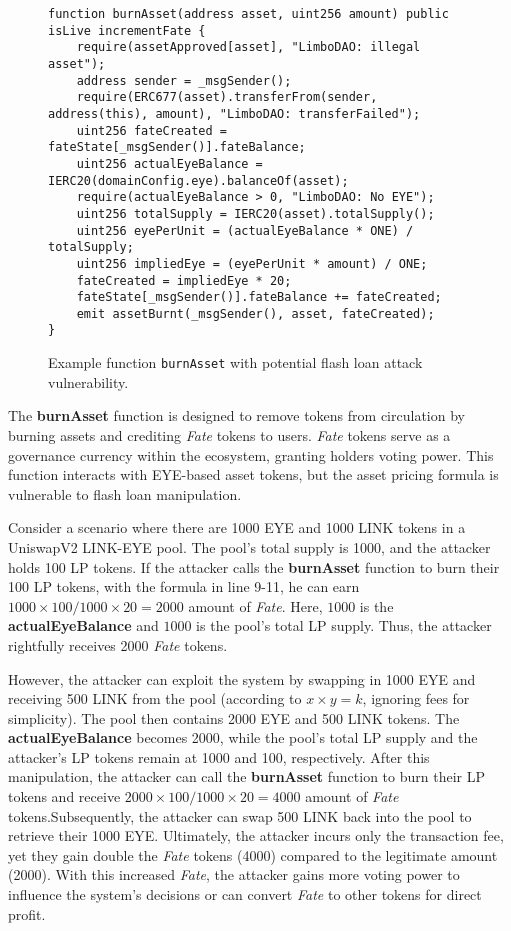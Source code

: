 \begin{figure}[h]
\centering
\begin{lstlisting}[language=Solidity]
function burnAsset(address asset, uint256 amount) public isLive incrementFate {
    require(assetApproved[asset], "LimboDAO: illegal asset");
    address sender = _msgSender();
    require(ERC677(asset).transferFrom(sender, address(this), amount), "LimboDAO: transferFailed");
    uint256 fateCreated = fateState[_msgSender()].fateBalance;
    uint256 actualEyeBalance = IERC20(domainConfig.eye).balanceOf(asset);
    require(actualEyeBalance > 0, "LimboDAO: No EYE");
    uint256 totalSupply = IERC20(asset).totalSupply();
    uint256 eyePerUnit = (actualEyeBalance * ONE) / totalSupply;
    uint256 impliedEye = (eyePerUnit * amount) / ONE;
    fateCreated = impliedEye * 20;
    fateState[_msgSender()].fateBalance += fateCreated;
    emit assetBurnt(_msgSender(), asset, fateCreated);
}
\end{lstlisting}
\caption{Example function \texttt{burnAsset} with potential flash loan attack vulnerability.}
\label{fig:priceoracle}
\end{figure}

The \textbf{burnAsset} function is designed to remove tokens from circulation by burning assets and crediting \textit{Fate} tokens to users. \textit{Fate} tokens serve as a governance currency within the ecosystem, granting holders voting power. This function interacts with EYE-based asset tokens, but the asset pricing formula is vulnerable to flash loan manipulation.

Consider a scenario where there are 1000 EYE and 1000 LINK tokens in a UniswapV2 LINK-EYE pool. The pool’s total supply is 1000, and the attacker holds 100 LP tokens. If the attacker calls the \textbf{burnAsset} function to burn their 100 LP tokens, with the formula in line 9-11, he can earn $1000 \times 100/1000 \times 20 = 2000$ amount of \textit{Fate}.
Here, $1000$ is the \textbf{actualEyeBalance} and $1000$ is the pool's total LP supply. Thus, the attacker rightfully receives 2000 \textit{Fate} tokens.

However, the attacker can exploit the system by swapping in 1000 EYE and receiving 500 LINK from the pool (according to $x \times y = k$, ignoring fees for simplicity). The pool then contains 2000 EYE and 500 LINK tokens. The \textbf{actualEyeBalance} becomes 2000, while the pool's total LP supply and the attacker's LP tokens remain at 1000 and 100, respectively. After this manipulation, the attacker can call the \textbf{burnAsset} function to burn their LP tokens and receive $2000 \times 100/1000 \times 20 = 4000$ amount of \textit{Fate} tokens.Subsequently, the attacker can swap 500 LINK back into the pool to retrieve their 1000 EYE.
Ultimately, the attacker incurs only the transaction fee, yet they gain double the \textit{Fate} tokens (4000) compared to the legitimate amount (2000). With this increased \textit{Fate}, the attacker gains more voting power to influence the system’s decisions or can convert \textit{Fate} to other tokens for direct profit.

